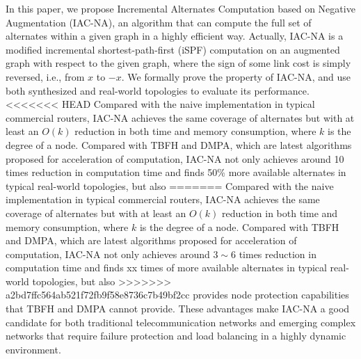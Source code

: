 In this paper, we propose Incremental Alternates Computation based on Negative
Augmentation (IAC-NA), an algorithm that can
compute the full set of alternates within a given graph in a highly efficient way.
Actually, IAC-NA is a modified incremental shortest-path-first (iSPF) computation
on an augmented graph with respect to the given graph, where the sign of some link cost
is simply reversed, i.e., from $x$ to $-x$. We formally prove the property of IAC-NA,
and use both synthesized and real-world topologies to evaluate its performance.
<<<<<<< HEAD
Compared with the naive implementation in typical commercial routers, IAC-NA achieves the same coverage of alternates but  
with at least an $O(k)$ reduction in both time and memory consumption, where $k$ is the degree of a node. 
Compared with TBFH and DMPA, which are latest algorithms proposed for acceleration of computation, 
IAC-NA not only achieves around 10 times reduction in computation time 
and finds 50\% more available alternates in typical real-world topologies, but also 
=======
Compared with the naive implementation in typical commercial routers, IAC-NA achieves the same coverage of alternates but
with at least an $O(k)$ reduction in both time and memory consumption, where $k$ is the degree of a node.
Compared with TBFH and DMPA, which are latest algorithms proposed for acceleration of computation,
IAC-NA not only achieves around $3 \sim 6$ times reduction in computation time
and finds xx times of more available alternates in typical real-world topologies, but also
>>>>>>> a2bd7ffc564ab521f72fb9f58e8736c7b49bf2cc
provides  node protection capabilities that TBFH and DMPA cannot provide.
These advantages make IAC-NA a good candidate for both traditional telecommunication networks
and emerging complex networks that require failure protection and load balancing
in a highly dynamic environment.
\iffalse
Our contributions are summarized as follows:
\begin{itemize}
\item We propose an incremental alternates computation (IAC) algorithm based on iSPF, which can compute all the next hops satisfied DC rule. %
\item Theoretical analysis indicates that the computation complexity of IAC is less than that of constructing a shortest path tree and  can provide the same network availability as DC.
\item We propose an IAC-NA algorithm which can  efficiently calculate
the minimum cost of all its neighbors to all other nodes of the
network on the shortest path tree rooted at the compute node. Therefore
IAC-NA can completely and efficiently deal with LFA problem.
\item Theoretical analysis and experiments results indicate that IAC-NA can provide the same network availability as LFA.
\end{itemize}
\fi

